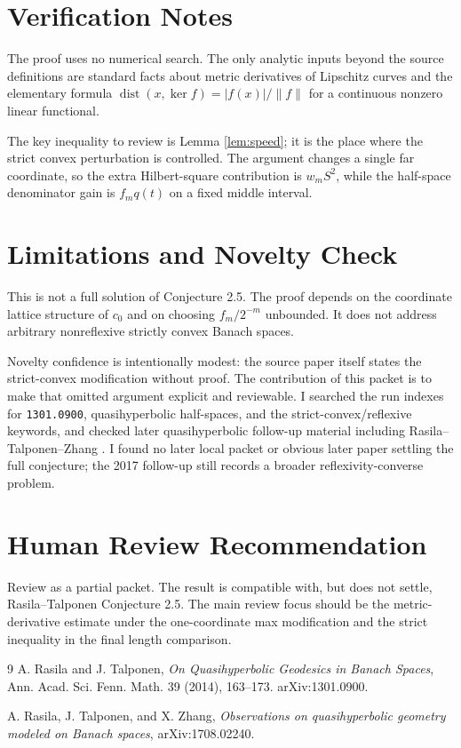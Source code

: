 \documentclass[11pt]{article}
\newcommand{\dist}{\operatorname{dist}}
\begin{document}
\section*{Verification Notes}

The proof uses no numerical search.  The only analytic inputs beyond the source definitions are standard facts about metric derivatives of Lipschitz curves and the elementary formula
\(\dist(x,\ker f)=|f(x)|/\|f\|\) for a continuous nonzero linear functional.

The key inequality to review is Lemma \ref{lem:speed}; it is the place where the strict convex perturbation is controlled.  The argument changes a single far coordinate, so the extra Hilbert-square contribution is \(w_mS^2\), while the half-space denominator gain is \(f_mq(t)\) on a fixed middle interval.

\section*{Limitations and Novelty Check}

This is not a full solution of Conjecture 2.5.  The proof depends on the coordinate lattice structure of \(c_0\) and on choosing \(f_m/2^{-m}\) unbounded.  It does not address arbitrary nonreflexive strictly convex Banach spaces.

Novelty confidence is intentionally modest: the source paper itself states the strict-convex modification without proof.  The contribution of this packet is to make that omitted argument explicit and reviewable.  I searched the run indexes for \texttt{1301.0900}, quasihyperbolic half-spaces, and the strict-convex/reflexive keywords, and checked later quasihyperbolic follow-up material including Rasila--Talponen--Zhang \cite{RTZ2017}.  I found no later local packet or obvious later paper settling the full conjecture; the 2017 follow-up still records a broader reflexivity-converse problem.

\section*{Human Review Recommendation}

Review as a partial packet.  The result is compatible with, but does not settle, Rasila--Talponen Conjecture 2.5.  The main review focus should be the metric-derivative estimate under the one-coordinate max modification and the strict inequality in the final length comparison.

\begin{thebibliography}{9}
A. Rasila and J. Talponen,
\emph{On Quasihyperbolic Geodesics in Banach Spaces},
Ann. Acad. Sci. Fenn. Math. 39 (2014), 163--173.
arXiv:1301.0900.

A. Rasila, J. Talponen, and X. Zhang,
\emph{Observations on quasihyperbolic geometry modeled on Banach spaces},
arXiv:1708.02240.
\end{thebibliography}
\end{document}
